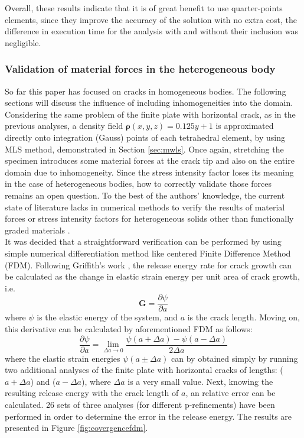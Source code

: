 \documentclass[11pt]{ACMEarticle}
\numberwithin{equation}{section}
\begin{document}
Overall, these results indicate that it is of great benefit to use quarter-points elements, since they improve the accuracy of the solution with no extra cost, the difference in execution time for the analysis with and without their inclusion was negligible. 
\subsubsection{Validation of material forces in the heterogeneous body}
So far this paper has focused on cracks in homogeneous bodies. The following sections will discuss the influence of including inhomogeneities into the domain. Considering the same problem of the finite plate with horizontal crack, as in the previous analyses, a density field $\mathbf{\rho}(x,y,z) = 0.125y + 1$ is approximated directly onto integration (Gauss) points of each tetrahedral element, by using MLS method, demonstrated in Section \ref{sec:mwls}. Once again, stretching the specimen introduces some material forces at the crack tip and also on the entire domain due to inhomogeneity. Since the stress intensity factor loses its meaning in the case of heterogeneous bodies, how to correctly validate those forces remains an open question. To the best of the authors' knowledge, the current state of literature lacks in numerical methods to verify the results of material forces or stress intensity factors for heterogeneous solids other than functionally graded materials \citep{kim2002finite}. \\
It was decided that a straightforward verification can be performed by using simple numerical differentiation method like centered Finite Difference Method (FDM). Following Griffith's work \citep{Griffith163}, the release energy rate for crack growth can be calculated as the change in elastic strain energy per unit area of crack growth, i.e.
\begin{equation}
\mathbf G = \frac{\partial \psi}{\partial a}
\end{equation}
where $\psi$ is the elastic energy of the system, and $a$ is the crack length. Moving on, this derivative can be calculated by aforementioned FDM as follows:
\begin{equation}
 \frac{\partial \psi}{\partial a} = \lim_{\Delta a \to 0} \frac{\psi(a + \Delta a) - \psi(a -\Delta a)}{2\Delta a}
\end{equation}
where the elastic strain energies $\psi(a \pm \Delta a)$ can by obtained simply by running two additional analyses of the finite plate with horizontal cracks of lengths: ($a + \Delta a$) and ($a - \Delta a$), where $\Delta a$ is a very small value. Next, knowing the resulting release energy with the crack length of $a$, an relative error can be calculated. 26 sets of three analyses (for different p-refinements) have been performed in order to determine the error in the release energy. The results are presented in Figure \ref{fig:covergencefdm}.
\end{document}
